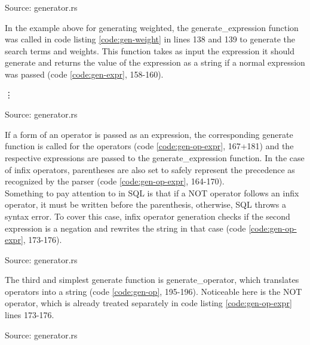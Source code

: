 \begin{codeenv}
    \label{code:gen-in-stat}
    
    \centerline{Source: generator.rs}
\end{codeenv}
In the example above for generating weighted, the generate\_expression function was called in code listing \ref{code:gen-weight} in lines 138 and 139 to generate the search terms and weights. This function takes as input the expression it should generate and returns the value of the expression as a string if a normal expression was passed (code \ref{code:gen-expr}, 158-160).
\begin{codeenv}
    \label{code:gen-expr}
    
    \vdots
    
    \centerline{Source: generator.rs}
\end{codeenv}
If a form of an operator is passed as an expression, the corresponding generate function is called for the operators (code \ref{code:gen-op-expr}, 167+181) and the respective expressions are passed to the generate\_expression function. In the case of infix operators, parentheses are also set to safely represent the precedence as recognized by the parser (code \ref{code:gen-op-expr}, 164-170).\\
Something to pay attention to in \ac{SQL} is that if a NOT operator follows an infix operator, it must be written before the parenthesis, otherwise, \ac{SQL} throws a syntax error. To cover this case, infix operator generation checks if the second expression is a negation and rewrites the string in that case (code \ref{code:gen-op-expr}, 173-176).
\begin{codeenv}
    \label{code:gen-op-expr}
    
    \centerline{Source: generator.rs}
\end{codeenv}
The third and simplest generate function is generate\_operator, which translates operators into a string (code \ref{code:gen-op}, 195-196). Noticeable here is the NOT operator, which is already treated separately in code listing \ref{code:gen-op-expr} lines 173-176.
\begin{codeenv}
    \label{code:gen-op}
    
    \centerline{Source: generator.rs}
\end{codeenv}